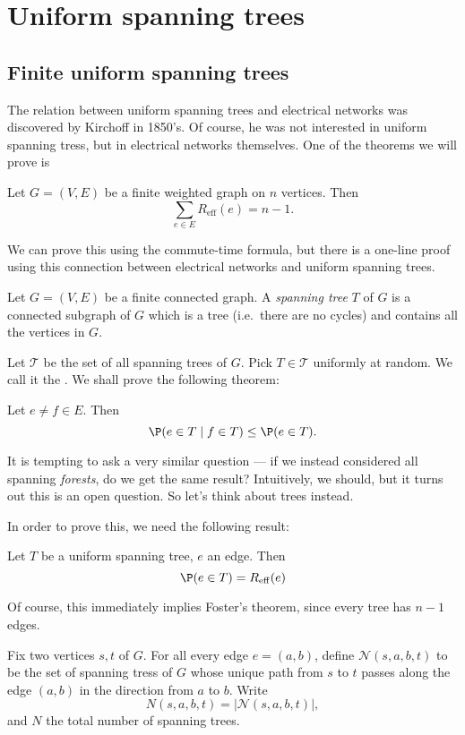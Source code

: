 \documentclass[a4paper]{article}
\begin{document}
\section{Uniform spanning trees}
\subsection{Finite uniform spanning trees}
The relation between uniform spanning trees and electrical networks was discovered by Kirchoff in 1850's. Of course, he was not interested in uniform spanning tress, but in electrical networks themselves. One of the theorems we will prove is
\begin{thm}
  Let $G = (V, E)$ be a finite weighted graph on $n$ vertices. Then
  \[
    \sum_{e \in E}R_{\mathrm{eff}}(e) = n - 1.
  \]
\end{thm}
We can prove this using the commute-time formula, but there is a one-line proof using this connection between electrical networks and uniform spanning trees.
\begin{defi}
  Let $G = (V, E)$ be a finite connected graph. A \emph{spanning tree} $T$ of $G$ is a connected subgraph of $G$ which is a tree (i.e.\ there are no cycles) and contains all the vertices in $G$.
\end{defi}

Let $\mathcal{T}$ be the set of all spanning trees of $G$. Pick $T \in \mathcal{T}$ uniformly at random. We call it the . We shall prove the following theorem:
\begin{thm}
  Let $e \not= f \in E$. Then
  \[
    \P(e \in T \mid f \in T) \leq \P(e \in T).
  \]
\end{thm}
It is tempting to ask a very similar question --- if we instead considered all spanning \emph{forests}, do we get the same result? Intuitively, we should, but it turns out this is an open question. So let's think about trees instead.

In order to prove this, we need the following result:
\begin{thm}[Kirchoff]
  Let $T$ be a uniform spanning tree, $e$ an edge. Then
  \[
    \P(e \in T) = R_{\mathrm{eff}}(e)
  \]
\end{thm}
Of course, this immediately implies Foster's theorem, since every tree has $n - 1$ edges.

\begin{notation}
  Fix two vertices $s, t$ of $G$. For all every edge $e = (a, b)$, define $\mathcal{N}(s, a, b, t)$ to be the set of spanning tress of $G$ whose unique path from $s$ to $t$ passes along the edge $(a, b)$ in the direction from $a$ to $b$. Write
  \[
    N(s, a, b, t) = |\mathcal{N}(s, a, b, t)|,
  \]
  and $N$ the total number of spanning trees.
\end{notation}
\end{document}
